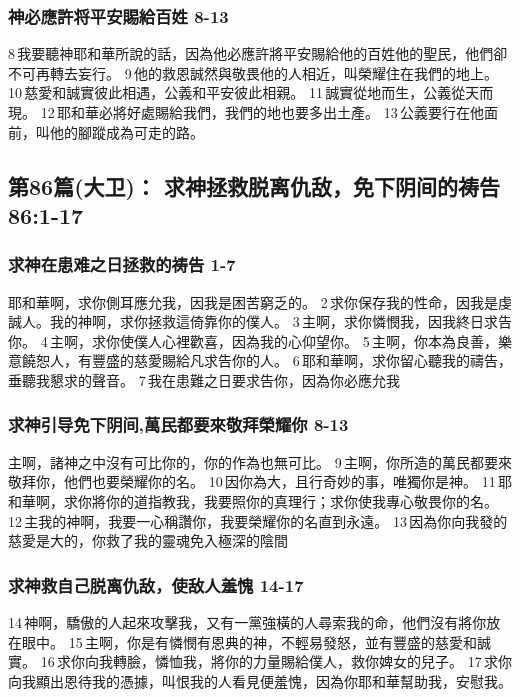 \subsubsection{神必應許将平安賜給百姓 8-13}
8 我要聽神耶和華所說的話，因為他必應許將平安賜給他的百姓他的聖民，他們卻不可再轉去妄行。
9 他的救恩誠然與敬畏他的人相近，叫榮耀住在我們的地上。
10 慈愛和誠實彼此相遇，公義和平安彼此相親。
11 誠實從地而生，公義從天而現。
12 耶和華必將好處賜給我們，我們的地也要多出土產。
13 公義要行在他面前，叫他的腳蹤成為可走的路。

\subsection{第86篇(大卫)： 求神拯救脱离仇敌，免下阴间的祷告 86:1-17}
\subsubsection{求神在患难之日拯救的祷告 1-7}
耶和華啊，求你側耳應允我，因我是困苦窮乏的。
2 求你保存我的性命，因我是虔誠人。我的神啊，求你拯救這倚靠你的僕人。
3 主啊，求你憐憫我，因我終日求告你。
4 主啊，求你使僕人心裡歡喜，因為我的心仰望你。
5 主啊，你本為良善，樂意饒恕人，有豐盛的慈愛賜給凡求告你的人。
6 耶和華啊，求你留心聽我的禱告，垂聽我懇求的聲音。
7 我在患難之日要求告你，因為你必應允我
\subsubsection{求神引导免下阴间,萬民都要來敬拜榮耀你 8-13}
主啊，諸神之中沒有可比你的，你的作為也無可比。
9 主啊，你所造的萬民都要來敬拜你，他們也要榮耀你的名。
10 因你為大，且行奇妙的事，唯獨你是神。
11 耶和華啊，求你將你的道指教我，我要照你的真理行；求你使我專心敬畏你的名。
12 主我的神啊，我要一心稱讚你，我要榮耀你的名直到永遠。
13 因為你向我發的慈愛是大的，你救了我的靈魂免入極深的陰間
\subsubsection{求神救自己脱离仇敌，使敌人羞愧 14-17}
14 神啊，驕傲的人起來攻擊我，又有一黨強橫的人尋索我的命，他們沒有將你放在眼中。
15 主啊，你是有憐憫有恩典的神，不輕易發怒，並有豐盛的慈愛和誠實。
16 求你向我轉臉，憐恤我，將你的力量賜給僕人，救你婢女的兒子。
17 求你向我顯出恩待我的憑據，叫恨我的人看見便羞愧，因為你耶和華幫助我，安慰我。

